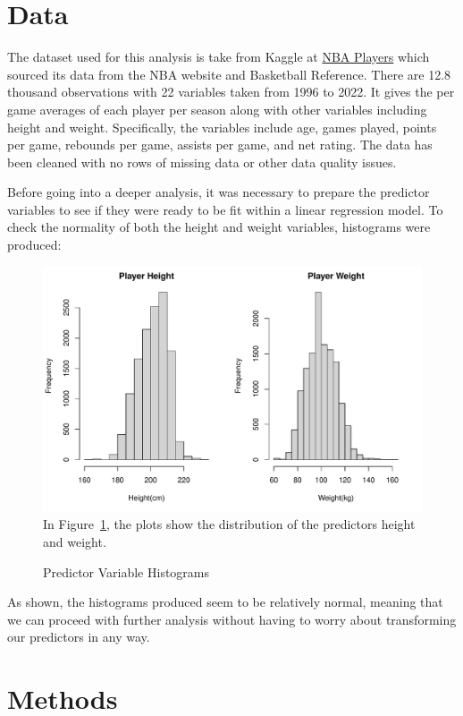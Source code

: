 \documentclass[12pt]{article}
\begin{document}
\section{Data}
\label{sec:data}

The dataset used for this analysis is take from Kaggle at \href{https://www.kaggle.com/datasets/justinas/nba-players-data}{NBA Players} 
which sourced its data from the NBA website and Basketball Reference. There are 12.8 thousand observations
with 22 variables taken from 1996 to 2022. It gives the per game averages of each player per season along with
other variables including height and weight. Specifically, the variables include age, games played, points per game,
rebounds per game, assists per game, and net rating. The data has been cleaned with no rows of missing data or
other data quality issues.

Before going into a deeper analysis, it was necessary to prepare the predictor variables to see if they were ready to
be fit within a linear regression model. To check the normality of both the height and weight variables, histograms
were produced:

\begin{figure} [h!]
	\caption{Predictor Variable Histograms}
	\includegraphics[width=1\textwidth]{predhistograms.pdf}
	\label{fig:predhistograms}
In Figure~\ref{fig:predhistograms}, the plots show the distribution of the predictors height and weight.
\end{figure}

As shown, the histograms produced seem to be relatively normal, meaning that we can proceed with further analysis
without having to worry about transforming our predictors in any way.

\section{Methods}
\label{sec:meth}
\end{document}
